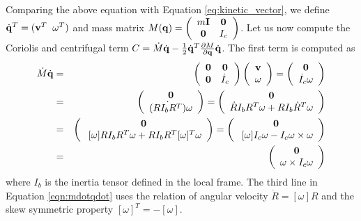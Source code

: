 Comparing the above equation with Equation
\ref{eq:kinetic_vector}, we define $\dot{\mathbf{q}}^T = (\mathbf{v}^T \;\;
\omega^T)$ and mass matrix $M(\mathbf{q}) =
\left(\begin{array}{cc}m\mathbf{I} & \mathbf{0} \\ \mathbf{0} &
    I_c \end{array}\right)$. Let us now compute the Coriolis and
centrifugal term $C = \dot{M}
\dot{\mathbf{q}} - \frac{1}{2}\dot{\mathbf{q}}^T \frac{\partial M}{\partial
  \mathbf{q}} \dot{\mathbf{q}}$. The first term is computed as
\begin{eqnarray}
\label{eqn:mdotqdot}
\dot{M}\dot{\mathbf{q}} &=& \left(\begin{array}{cc}
\mathbf{0} & \mathbf{0} \\ 
\mathbf{0} &   \dot{I}_c 
\end{array}\right)
\left(\begin{array}{c}\mathbf{v} \\ \omega\end{array}\right) = 
\left(\begin{array}{c}\mathbf{0} \\ \dot{I}_c \omega\end{array}\right)
\nonumber \\
& = & \left(\begin{array}{c}\mathbf{0} \\ \dot{(R I_b R^T)}
    \omega\end{array}\right) = \left(\begin{array}{c}\mathbf{0} \\ \dot{R}
    I_b R^T \omega + R I_b \dot{R}^T \omega \end{array}\right)
\nonumber \\
& = & \left(\begin{array}{c}\mathbf{0} \\ \;[\omega] R I_b R^T \omega + R
    I_b R^T [\omega]^T \omega \end{array}\right) =
\left(\begin{array}{c}\mathbf{0} \\ \;[\omega] I_c \omega - I_c\omega \times \omega \end{array}\right) \nonumber \\
& = & \left(\begin{array}{c}\mathbf{0} \\ \omega \times I_c \omega \end{array}\right)
\end{eqnarray}
where $I_b$ is the inertia tensor defined in the local frame. The
third line in Equation \ref{eqn:mdotqdot} uses the relation of angular
velocity $\dot{R} = [\omega] R$ and the skew symmetric property
$[\omega]^T = -[\omega]$.

